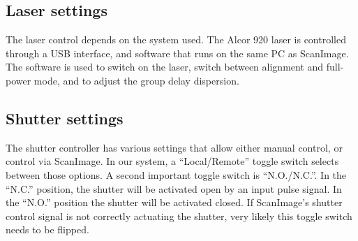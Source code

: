 \documentclass[10pt,letterpaper]{article}
\begin{document}
\subsection{Laser settings}
The laser control depends on the system used. The Alcor 920 laser is controlled through a USB interface, and software that runs on the same PC as ScanImage. The software is used to switch on the laser, switch between alignment and full-power mode, and to adjust the group delay dispersion. 

\subsection{Shutter settings}
The shutter controller has various settings that allow either manual control, or control via ScanImage. In our system, a ``Local/Remote'' toggle switch selects between those options. A second important toggle switch is ``N.O./N.C.''. In the ``N.C.'' position, the shutter will be activated open by an input pulse signal. In the ``N.O.'' position the shutter will be activated closed. If ScanImage's shutter control signal is not correctly actuating the shutter, very likely this toggle switch needs to be flipped.
%
\end{document}
